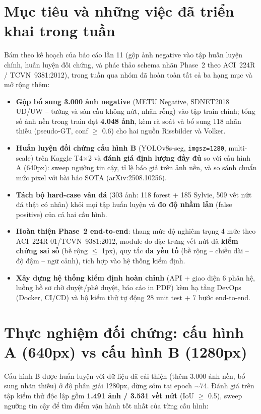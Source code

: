 \documentclass[12pt,a4paper]{article}
\begin{document}
\section{Mục tiêu và những việc đã triển khai trong tuần}
Bám theo kế hoạch của báo cáo lần 11 (gộp ảnh negative vào tập huấn luyện chính, huấn luyện đối chứng, và phác thảo schema nhãn Phase~2 theo ACI~224R / TCVN~9381:2012), trong tuần qua nhóm đã hoàn toàn tất cả ba hạng mục và mở rộng thêm:
\begin{itemize}[leftmargin=*]
    \item \textbf{Gộp bổ sung 3.000 ảnh negative} (METU Negative, SDNET2018 UD/UW -- tường và sàn cầu không nứt, nhãn rỗng) vào tập train chính; tổng số ảnh nền trong train đạt \textbf{4.048 ảnh}, kèm rà soát và bổ sung 118 nhãn thiếu (pseudo-GT, conf $\geq$ 0.6) cho hai nguồn Rissbilder và Volker.
    \item \textbf{Huấn luyện đối chứng cấu hình B} (YOLOv8s-seg, \texttt{imgsz=1280}, multi-scale) trên Kaggle T4$\times$2 và \textbf{đánh giá định lượng đầy đủ} so với cấu hình A (640px): sweep ngưỡng tin cậy, tỉ lệ báo giả trên ảnh nền, và so sánh chuẩn mức pixel với bài báo SOTA (arXiv:2508.10256).
    \item \textbf{Tách bộ hard-case vân đá} (303 ảnh: 118 forest + 185 Sylvie, 509 vết nứt đá thật có nhãn) khỏi mọi tập huấn luyện và \textbf{đo độ nhầm lẫn} (false positive) của cả hai cấu hình.
    \item \textbf{Hoàn thiện Phase~2 end-to-end}: thang mức độ nghiêm trọng 4 mức theo ACI~224R-01/TCVN~9381:2012, module đo đặc trưng vết nứt đã \textbf{kiểm chứng sai số} (bề rộng $\leq$ 1px), quy tắc \textbf{đa yếu tố} (bề rộng -- chiều dài -- độ đậm -- ngữ cảnh), tích hợp vào hệ thống kiểm định.
    \item \textbf{Xây dựng hệ thống kiểm định hoàn chỉnh} (API + giao diện 6 phân hệ, luồng hồ sơ chờ duyệt/phê duyệt, báo cáo in PDF) kèm hạ tầng DevOps (Docker, CI/CD) và bộ kiểm thử tự động 28 unit test + 7 bước end-to-end.
\end{itemize}

\section{Thực nghiệm đối chứng: cấu hình A (640px) vs cấu hình B (1280px)}
Cấu hình B được huấn luyện với dữ liệu đã cải thiện (thêm 3.000 ảnh nền, bổ sung nhãn thiếu) ở độ phân giải 1280px, dừng sớm tại epoch $\sim$74. Đánh giá trên tập kiểm thử độc lập gồm \textbf{1.491 ảnh / 3.531 vết nứt} (IoU $\geq$ 0.5), sweep ngưỡng tin cậy để tìm điểm vận hành tốt nhất của từng cấu hình:
\end{document}
